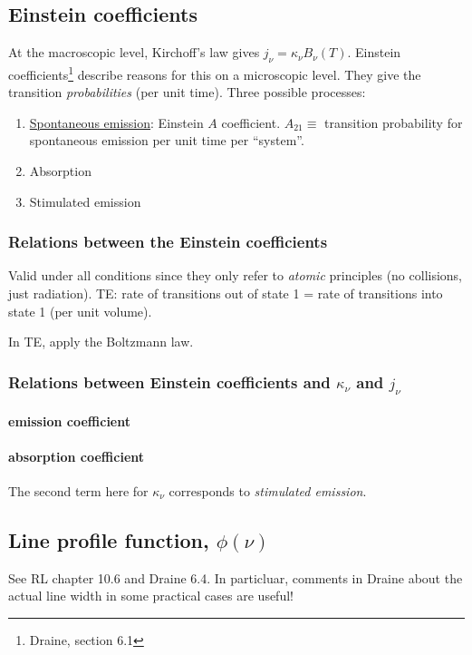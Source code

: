 \documentclass[12pt]{article}
\newcommand{\mar}[1]{\hspace{0pt}\marginpar{-\textcolor{black}{#1}-}}
\begin{document}
\subsection{Einstein coefficients}
At the macroscopic level, Kirchoff's law gives $ j_{\nu} = \kappa_{\nu}
B_{\nu}(T) $. Einstein coefficients\footnote{Draine, section 6.1} describe
reasons for this on a microscopic level. They give the transition
\emph{probabilities} (per unit time). Three possible processes:
\begin{enumerate}[noitemsep]
    \item \underline{Spontaneous emission}: Einstein $A$ coefficient.
        $A_{21} \equiv$ transition probability for spontaneous emission
        per unit time per ``system''.
    \item Absorption
    \item \mar{29}Stimulated emission
\end{enumerate}

\subsubsection{Relations between the Einstein coefficients}
Valid under all conditions since they only refer to \emph{atomic} principles
(no collisions, just radiation).
TE: rate of transitions out of state 1 = rate of transitions into state 1
(per unit volume).

In\mar{30} TE, apply the Boltzmann law.

\subsubsection{Relations between Einstein coefficients and $\kappa_{\nu}$ and $j_{\nu}$}
\paragraph{emission coefficient}
\paragraph{absorption coefficient}

The\mar{31} second term here for $\kappa_{\nu}$ corresponds to
\emph{stimulated emission}.

\subsection{Line profile function, $\phi(\nu)$}
See RL chapter 10.6 and Draine 6.4. In particluar, comments in Draine about
the actual line width in some practical cases are useful!
\end{document}
